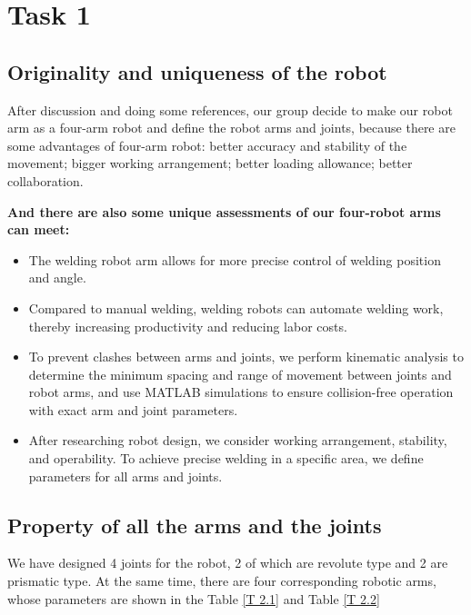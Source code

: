 \section{Task 1}
\FloatBarrier %


\subsection{Originality and uniqueness of the robot}


After discussion and doing some references, our group decide to make our robot arm as a four-arm robot and define the robot arms and joints, because there are some advantages of four-arm robot: better accuracy and stability of the movement; bigger working arrangement; better loading allowance; better collaboration.

\textbf{And there are also some unique assessments of our four-robot arms can meet:}
\begin{itemize}
    \item The welding robot arm allows for more precise control of welding position and angle.
    \item Compared to manual welding, welding robots can automate welding work, thereby increasing productivity and reducing labor costs.
    \item To prevent clashes between arms and joints, we perform kinematic analysis to determine the minimum spacing and range of movement between joints and robot arms, and use MATLAB simulations to ensure collision-free operation with exact arm and joint parameters.
    \item After researching robot design, we consider working arrangement, stability, and operability. To achieve precise welding in a specific area, we define parameters for all arms and joints.
\end{itemize}

\subsection{Property of all the arms and the joints}

We have designed 4 joints for the robot, 2 of which are revolute type and 2 are prismatic type. At the same time, there are four corresponding robotic arms, whose parameters are shown in the Table \ref{T 2.1} and Table \ref{T 2.2}

